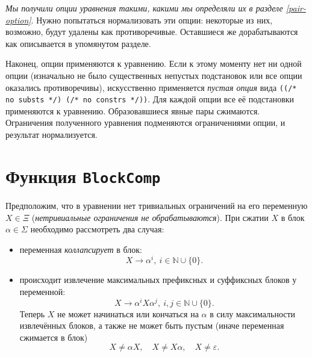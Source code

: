 \documentclass[12pt]{article}
\begin{document}
\textit{Мы получили опции уравнения такими, какими мы определяли их в разделе
\emph{\ref{pair-option}}}. Нужно попытаться нормализовать эти опции: некоторые
из них, возможно, будут удалены как противоречивые. Оставшиеся же
дорабатываются как описывается в упомянутом разделе.

Наконец, опции применяются к уравнению. Если к этому моменту нет ни одной опции
(изначально не было существенных непустых подстановок или все опции оказались
противоречивы), искусственно применяется \textit{пустая опция} вида
\texttt{((/* no substs */) (/* no constrs */))}. Для каждой опции все её
подстановки применяются к уравнению. Образовавшиеся явные пары сжимаются.
Ограничения полученного уравнения подменяются ограничениями опции, и результат
нормализуется.



\section{Функция \texttt{BlockComp}}

Предположим, что в уравнении нет тривиальных ограничений на его переменную $X
\in \Xi$ (\textit{нетривиальные ограничения не обрабатываются}). При сжатии $X$
в блок $\alpha \in \Sigma$ необходимо рассмотреть два случая:
\begin{itemize}
  \item переменная \textit{коллапсирует} в блок:
  \begin{equation} \label{block:collapsed}
    X \to \alpha^i, \ i \in \mathbb{N} \cup \{ 0 \}.
  \end{equation}

  \item происходит извлечение максимальных префиксных и суффиксных блоков у
  переменной:
  \begin{equation} \label{block:extracted}
    X \to \alpha^i X \alpha^j, \ i, j \in \mathbb{N} \cup \{ 0 \}.
  \end{equation}
  Теперь $X$ не может начинаться или кончаться на $\alpha$ в силу
  максимальности извлечённых блоков, а также не может быть пустым (иначе
  переменная сжимается в блок)
  \begin{equation} \label{block:constraints}
    X \ne \alpha X, \quad X \ne X \alpha, \quad X \ne \varepsilon.
  \end{equation}
\end{itemize}
\end{document}
